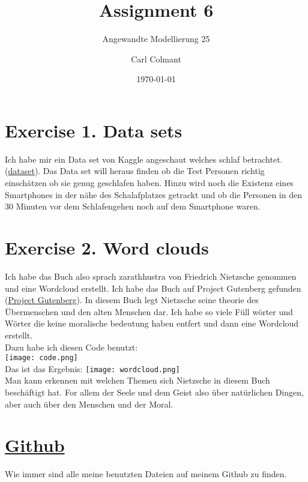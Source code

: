 \documentclass{scrartcl}
\title{Assignment 6}
\subtitle{Angewandte Modellierung 25}
\author{Carl Colmant}
\date{\today}
\begin{document}
\maketitle
\newpage
\section*{Exercise 1. Data sets}
Ich habe mir ein Data set von Kaggle angeschaut welches schlaf betrachtet.(\href{https://www.kaggle.com/datasets/uom190346a/sleep-health-and-lifestyle-datasethttps://www.kaggle.com/datasets/mlomuscio/sleepstudypilot}{dataset}). Das Data set will heraus finden ob die Test Personen richtig einschätzen ob sie genug geschlafen haben. Hinzu wird noch die Existenz eines Smartphones in der nähe des Schalafplatzes getrackt und ob die Personen in den 30 Minuten vor dem Schlafengehen noch auf dem Smartphone waren.\\ 

\section*{Exercise 2. Word clouds}
Ich habe das Buch also sprach zarathhustra von Friedrich Nietzsche genommen und eine Wordcloud erstellt. Ich habe das Buch auf Project Gutenberg gefunden (\href{https://www.gutenberg.org/ebooks/7205https://www.gutenberg.org/ebooks/1998}{Project Gutenberg}). In diesem Buch legt Nietzsche seine theorie des Übermenschen und den alten Menschen dar. Ich habe so viele Füll wörter und Wörter die keine moralische bedeutung haben entfert und dann eine Wordcloud erstellt.\\
Dazu habe ich diesen Code benutzt:\\
\texttt{[image: code.png]}\\
Das ist das Ergebnis:
\texttt{[image: wordcloud.png]}\\
Man kann erkennen mit welchen Themen sich Nietzsche in diesem Buch beschäftigt hat. For allem der Seele und dem Geist also über natürlichen Dingen, aber auch über den Menschen und der Moral.\\


\section*{\href{https://github.com/7hands/Angewandte-Modellierung-25-Colmant}{Github}}
Wie immer sind alle meine benutzten Dateien auf meinem Github zu finden.
\end{document}

